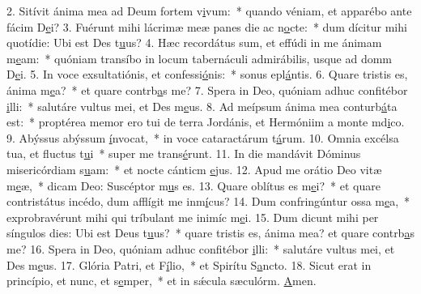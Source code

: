 2. Sitívit ánima mea ad Deum fortem v\uline{i}vum:~* quando véniam, et apparébo ante fácim D\uline{e}i?
3. Fuérunt mihi lácrimæ meæ panes die ac n\uline{o}cte:~* dum dícitur mihi quotídie: Ubi est Des t\uline{u}us?
4. Hæc recordátus sum, et effúdi in me ánimam m\uline{e}am:~* quóniam transíbo in locum tabernáculi admirábilis, usque ad domm D\uline{e}i.
5. In voce exsultatiónis, et confessi\uline{ó}nis:~* sonus epl\uline{á}ntis.
6. Quare tristis es, ánima m\uline{e}a?~* et quare contrb\uline{a}s me?
7. Spera in Deo, quóniam adhuc confitébor \uline{i}lli:~* salutáre vultus mei, et Des m\uline{e}us.
8. Ad meípsum ánima mea conturb\uline{á}ta est:~* proptérea memor ero tui de terra Jordánis, et Hermóniim a monte md\uline{i}co.
9. Abýssus abýssum \uline{í}nvocat,~* in voce cataractárum t\uline{á}rum.
10. Omnia excélsa tua, et fluctus t\uline{u}i~* super me trans\uline{é}runt.
11. In die mandávit Dóminus misericórdiam s\uline{u}am:~* et nocte cánticm \uline{e}jus.
12. Apud me orátio Deo vitæ m\uline{e}æ,~* dicam Deo: Suscéptor m\uline{u}s es.
13. Quare oblítus es m\uline{e}i?~* et quare contristátus incédo, dum afflígit me inm\uline{í}cus?
14. Dum confringúntur ossa m\uline{e}a,~* exprobravérunt mihi qui tríbulant me inimíc m\uline{e}i.
15. Dum dicunt mihi per síngulos dies: Ubi est Deus t\uline{u}us?~* quare tristis es, ánima mea? et quare contrb\uline{a}s me?
16. Spera in Deo, quóniam adhuc confitébor \uline{i}lli:~* salutáre vultus mei, et Des m\uline{e}us.
17. Glória Patri, et F\uline{í}lio,~* et Spirítu S\uline{a}ncto.
18. Sicut erat in princípio, et nunc, et s\uline{e}mper,~* et in sǽcula sæculórm. \uline{A}men.
